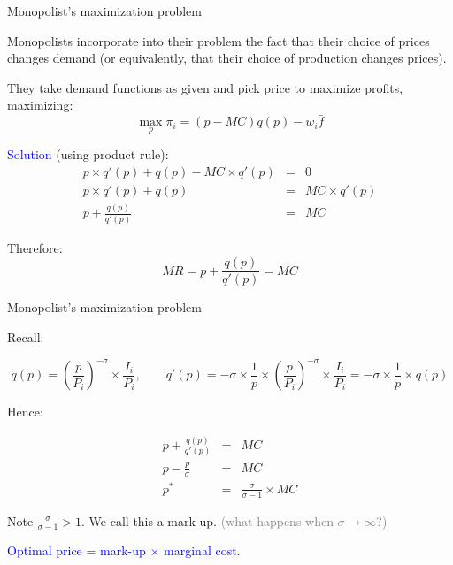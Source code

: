 \documentclass[notes,11pt, aspectratio=169, xcolor=table]{beamer}
\newcommand{\blue}[1]{\textcolor{blue}{#1}}
\newenvironment{wideitemize}{\itemize\addtolength{\itemsep}{10pt}}{\enditemize}
\begin{document}
\begin{frame}{Monopolist's maximization problem}

\begin{wideitemize}
    \item Monopolists incorporate into their problem the fact that their choice of prices changes demand (or equivalently, that their choice of production changes prices).
    \item<2-> They take demand functions as given and pick price to maximize profits, maximizing:
    \begin{equation*}
        \max_{p} \pi_i = (p-MC)q(p) - w_i \bar{f}
    \end{equation*}

    \item<3-> \blue{Solution} (using product rule):
    \begin{eqnarray*}
        p \times q'(p) +  q(p) - MC \times q'(p) &=& 0 \\
        p \times q'(p) +  q(p) &=& MC \times q'(p) \\
        p  +  \frac{q(p)}{q'(p)} &=& MC
    \end{eqnarray*}
    
    \item<4-> Therefore: \begin{equation*}
        MR = p + \frac{q(p)}{q'(p)} = MC
    \end{equation*}

\end{wideitemize}
    
\end{frame}

\begin{frame}{Monopolist's maximization problem}

    \begin{wideitemize}
            \item Recall:

    \begin{equation*}
        q(p) = \left( \frac{p}{P_i} \right)^{-\sigma} \times \frac{I_i}{P_i}, \qquad q'(p) = -\sigma \times \frac{1}{p} \times \left( \frac{p}{P_i} \right)^{-\sigma} \times \frac{I_i}{P_i}  = -\sigma \times \frac{1}{p} \times q(p)
    \end{equation*}

    \item<2-> Hence: 

    \begin{eqnarray*}
        p + \frac{q(p)}{q'(p)} &=& MC \\
        p - \frac{p}{\sigma} &=& MC \\
p^* &=& \frac{\sigma}{\sigma -1}\times MC 
    \end{eqnarray*}

    \item<3-> Note $\frac{\sigma}{\sigma -1} > 1$. We call this a mark-up. 
    { \scriptsize \qquad \textcolor{gray}{(what happens when $\sigma \to \infty$?)} }
    \item<4-> \blue{Optimal price = mark-up $\times$ marginal cost.}

    
    \end{wideitemize}
\end{frame}
\end{document}
